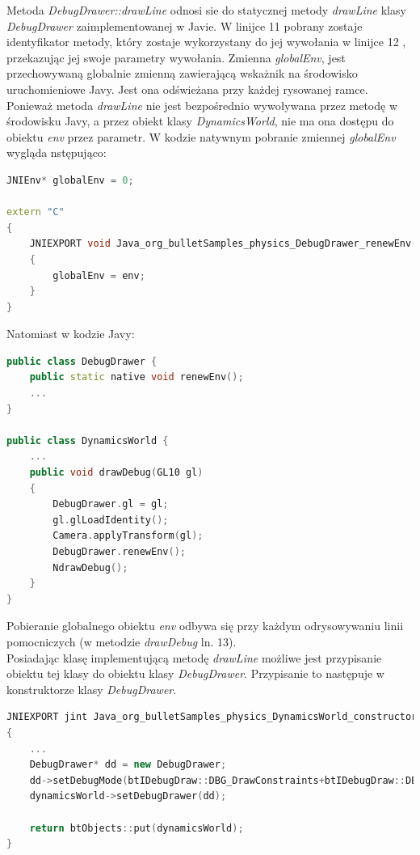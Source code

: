 Metoda \emph{DebugDrawer::drawLine} odnosi sie do statycznej metody
\emph{drawLine} klasy \emph{DebugDrawer} zaimplementowanej w Javie. W linijce
11 pobrany zostaje identyfikator metody, który zostaje wykorzystany do jej
wywołania w linijce 12 , przekazując jej swoje parametry wywołania. Zmienna
\emph{globalEnv}, jest przechowywaną globalnie zmienną zawierającą wskażnik na
środowisko uruchomieniowe Javy. Jest ona odświeżana przy każdej rysowanej
ramce. Ponieważ metoda \emph{drawLine} nie jest bezpośrednio wywoływana przez
metodę w środowisku Javy, a przez obiekt klasy \emph{DynamicsWorld}, nie ma ona
dostępu do obiektu \emph{env} przez parametr. W kodzie natywnym pobranie
zmiennej \emph{globalEnv} wygląda nstępująco:

\begin{lstlisting}[language=c++, caption=Deklaracja
funkcji renewEnv w kodzie natywnym,label=lis:renewEnvNat]
JNIEnv* globalEnv = 0;

extern "C"
{
	JNIEXPORT void Java_org_bulletSamples_physics_DebugDrawer_renewEnv(JNIEnv* env, jclass claz)
	{
		globalEnv = env;
	}
}
\end{lstlisting}

Natomiast w kodzie Javy:

\begin{lstlisting}[language=c++, caption=Deklaracja
i wykorzystanie metody renewEnv w kodzie Javy,label=lis:renewEnvJav]
public class DebugDrawer {
	public static native void renewEnv();
	...
}

public class DynamicsWorld {
	...
	public void drawDebug(GL10 gl)
	{
		DebugDrawer.gl = gl;
		gl.glLoadIdentity();
		Camera.applyTransform(gl);
		DebugDrawer.renewEnv();
		NdrawDebug();
	}
}
\end{lstlisting}

Pobieranie globalnego obiektu \emph{env} odbywa się przy każdym odrysowywaniu
linii pomocniczych (w metodzie \emph{drawDebug} ln. 13).\\
Posiadając klasę implementującą metodę \emph{drawLine} możliwe jest przypisanie
obiektu tej klasy do obiektu klasy \emph{DebugDrawer}. Przypisanie to następuje
w konstruktorze klasy \emph{DebugDrawer}.

\begin{lstlisting}[language=c++, caption=Przypisanie
obiektu DebugDrawer obiektowi DynamicsWorld,label=lis:DynamicsWorldConstructor]
JNIEXPORT jint Java_org_bulletSamples_physics_DynamicsWorld_constructor( JNIEnv* env, jobject self )
{
	...
    DebugDrawer* dd = new DebugDrawer;
    dd->setDebugMode(btIDebugDraw::DBG_DrawConstraints+btIDebugDraw::DBG_DrawConstraintLimits);
    dynamicsWorld->setDebugDrawer(dd);

	return btObjects::put(dynamicsWorld);
}
\end{lstlisting}

